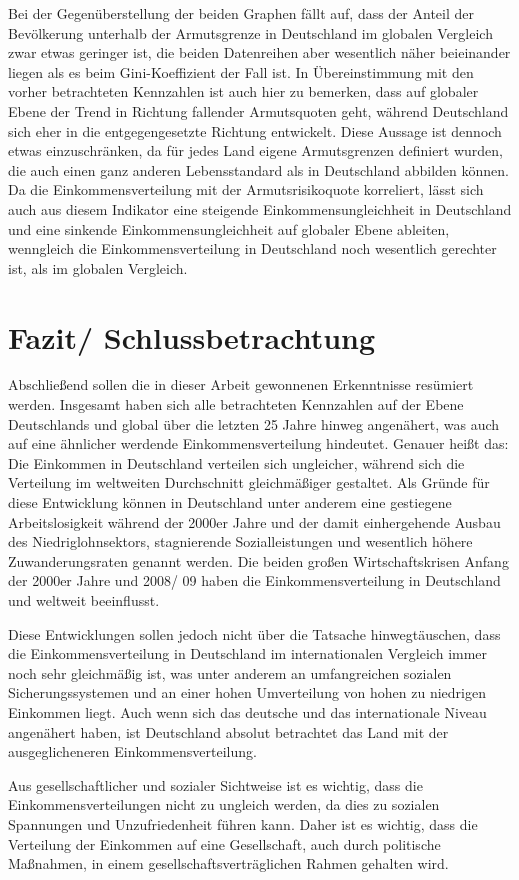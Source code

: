 Bei der Gegenüberstellung der beiden Graphen fällt auf, dass der Anteil der Bevölkerung unterhalb der Armutsgrenze in Deutschland im globalen Vergleich zwar etwas geringer ist, die beiden Datenreihen aber wesentlich näher beieinander liegen als es \zB beim Gini-Koeffizient der Fall ist. In Übereinstimmung mit den vorher betrachteten Kennzahlen ist auch hier zu bemerken, dass auf globaler Ebene der Trend in Richtung fallender Armutsquoten geht, während Deutschland  sich eher in die entgegengesetzte Richtung entwickelt. Diese Aussage ist dennoch etwas einzuschränken, da für jedes Land eigene Armutsgrenzen definiert wurden, die auch einen ganz anderen Lebensstandard als in Deutschland abbilden können. Da die Einkommensverteilung mit der Armutsrisikoquote korreliert, lässt sich auch aus diesem Indikator eine steigende Einkommensungleichheit in Deutschland und eine sinkende Einkommensungleichheit auf globaler Ebene ableiten, wenngleich die Einkommensverteilung in Deutschland noch wesentlich gerechter ist, als im globalen Vergleich.

\chapter{Fazit/ Schlussbetrachtung}

Abschlie{\ss}end sollen die in dieser Arbeit gewonnenen Erkenntnisse resümiert werden. Insgesamt haben sich alle betrachteten Kennzahlen auf der Ebene Deutschlands und global über die letzten 25 Jahre hinweg angenähert, was auch auf eine ähnlicher werdende Einkommensverteilung hindeutet. Genauer hei{\ss}t das: Die Einkommen in Deutschland verteilen sich ungleicher, während sich die Verteilung im weltweiten Durchschnitt gleichmä{\ss}iger gestaltet. Als Gründe für diese Entwicklung können in Deutschland unter anderem eine gestiegene Arbeitslosigkeit während der 2000er Jahre und der damit einhergehende Ausbau des Niedriglohnsektors, stagnierende Sozialleistungen und wesentlich höhere Zuwanderungsraten genannt werden. Die beiden gro{\ss}en Wirtschaftskrisen Anfang der 2000er Jahre und 2008/ 09 haben die Einkommensverteilung in Deutschland und weltweit beeinflusst.

Diese Entwicklungen sollen jedoch nicht über die Tatsache hinwegtäuschen, dass die Einkommensverteilung in Deutschland im internationalen Vergleich immer noch sehr gleichmä{\ss}ig ist, was unter anderem an umfangreichen sozialen Sicherungssystemen und an einer hohen Umverteilung von hohen zu niedrigen Einkommen liegt. Auch wenn sich das deutsche und das internationale Niveau angenähert haben, ist Deutschland absolut betrachtet das Land mit der ausgeglicheneren Einkommensverteilung.

Aus gesellschaftlicher und sozialer Sichtweise ist es wichtig, dass die Einkommensverteilungen nicht zu ungleich werden, da dies zu sozialen Spannungen und Unzufriedenheit führen kann. Daher ist es wichtig, dass die Verteilung der Einkommen auf eine Gesellschaft, auch durch politische Ma{\ss}nahmen, in einem gesellschaftsverträglichen Rahmen gehalten wird.